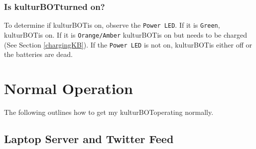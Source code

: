 \documentclass[]{article}
\newcommand{\kb}{kulturBOT}
\newcommand{\kbspace}{\kb \space}
\newcommand{\mykb}{my \kb}
\newcommand{\mykbspace}{\mykb \space}
\begin{document}
\subsubsection{Is \kbspace turned on?}
\label{isKbOn}
To determine if \kbspace is on, observe the \texttt{Power LED}. If it is \texttt{Green}, \kbspace is on. If it is \texttt{Orange/Amber} \kbspace is on but needs to be charged (See Section \ref{chargingKB}). If the \texttt{Power LED} is not on, \kbspace is either off or the batteries are dead.

\section{Normal Operation}
The following outlines how to get \mykbspace operating normally.

\subsection{Laptop Server and Twitter Feed}
\end{document}
